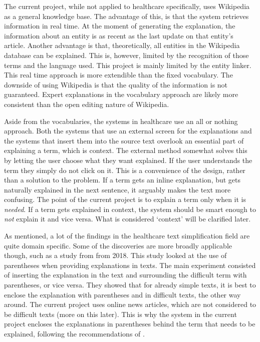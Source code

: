 \documentclass[
10pt, %
a4paper, %
oneside, %
headinclude,footinclude, %
] {book}%
\begin{document}
The current project, while not applied to healthcare specifically, uses Wikipedia as a general knowledge base.
The advantage of this, is that the system retrieves information in real time.
At the moment of generating the explanation, the information about an entity is as recent as the last update on that entity's article.
Another advantage is that, theoretically, all entities in the Wikipedia database can be explained.
This is, however, limited by the recognition of those terms and the language used.
This project is mainly limited by the entity linker.
This real time approach is more extendible than the fixed vocabulary.
The downside of using Wikipedia is that the quality of the information is not guaranteed.
Expert explanations in the vocabulary approach are likely more consistent than the open editing nature of Wikipedia.

Aside from the vocabularies, the systems in healthcare use an all or nothing approach.
Both the systems that use an external screen for the explanations and the systems that insert them into the source text overlook an essential part of explaining a term, which is context.
The external method somewhat solves this by letting the user choose what they want explained.
If the user understands the term they simply do not click on it.
This is a convenience of the design, rather than a solution to the problem.
If a term gets an inline explanation, but gets naturally explained in the next sentence, it arguably makes the text more confusing.
The point of the current project is to explain a term only when it is \textit{needed}.
If a term gets explained in context, the system should be smart enough to \textit{not} explain it and vice versa.
What is considered `context' will be clarified later.

As mentioned, a lot of the findings in the healthcare text simplification field are quite domain specific.
Some of the discoveries are more broadly applicable though, such as a study from \citeauthor{gu2018} from 2018.
This study looked at the use of parentheses when providing explanations in texts.
The main experiment consisted of inserting the explanation in the text and surrounding the difficult term with parentheses, or vice versa.
They showed that for already simple texts, it is best to enclose the explanation with parentheses and in difficult texts, the other way around.
The current project uses online news articles, which are not considered to be difficult texts (more on this later).
This is why the system in the current project encloses the explanations in parentheses behind the term that needs to be explained, following the recommendations of \citeauthor{gu2018}.
\end{document}

